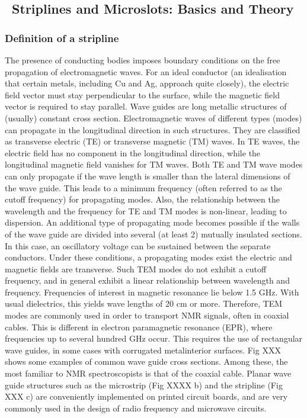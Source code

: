 \subsection{~Striplines and Microslots: Basics and
Theory}\label{striplines-and-microslots-basics-and-theory}

\subsubsection{Definition of a
stripline}\label{definition-of-a-stripline}

The presence of conducting bodies imposes boundary conditions on the
free propagation of electromagnetic waves. For an ideal conductor (an
idealisation that certain metals, including Cu and Ag, approach quite
closely), the electric field vector must stay perpendicular to the
surface, while the magnetic field vector is required to stay parallel.
Wave guides are long metallic structures of (usually) constant cross
section. Electromagnetic waves of different types (modes) can propagate
in the longitudinal direction in such structures. They are classified as
transverse electric (TE) or transverse magnetic (TM) waves. In TE waves,
the electric field has no component in the longitudinal direction, while
the longitudinal magnetic field vanishes for TM waves. Both TE and TM
wave modes can only propagate if the wave length is smaller than the
lateral dimensions of the wave guide. This leads to a minimum frequency
(often referred to as the cutoff frequency) for propagating modes. Also,
the relationship between the wavelength and the frequency for TE and TM
modes is non-linear, leading to dispersion. An additional type of
propagating mode becomes possible if the walls of the wave guide are
divided into several (at least 2) mutually insulated sections. In this
case, an oscillatory voltage can be sustained between the separate
conductors. Under these conditions, a propagating modes exist
 the electric and magnetic fields are transverse. Such TEM
modes do not exhibit a cutoff frequency, and in general exhibit a linear
relationship between wavelength and frequency. Frequencies of interest
in magnetic resonance lie below 1.5 GHz. With usual dielectrics, this
yields wave lengths of 20 cm or more. Therefore, TEM modes are commonly
used in order to transport NMR signals, often in coaxial cables. This is
different in electron paramagnetic resonance (EPR), where frequencies up
to several hundred GHz occur. This requires the use of rectangular wave
guides, in some cases with corrugated metalinterior surfaces. Fig XXX
shows some examples of common wave guide cross sections. Among these,
the most familiar to NMR spectroscopists is that of the coaxial cable.
Planar wave guide structures such as the microstrip (Fig XXXX b) and the
stripline (Fig XXX c) are conveniently implemented on printed circuit
boards, \cite{Barret:1955ie} and are very commonly used in the design of
radio frequency and microwave circuits.

